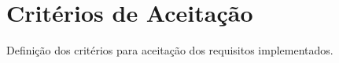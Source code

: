 \section{Critérios de Aceitação}
Definição dos critérios para aceitação dos requisitos implementados. 